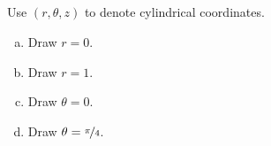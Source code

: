 


\subsection*{\Conceptual}

\begin{question}
Use $(r,\theta,z)$ to denote cylindrical coordinates.
\begin{enumerate}[(a)]
\item
Draw $r=0$.
\item
Draw $r=1$.
\item 
Draw $\theta=0$.
\item
Draw $\theta=\nicefrac{\pi}{4}$.
\end{enumerate}

\end{question}

%

